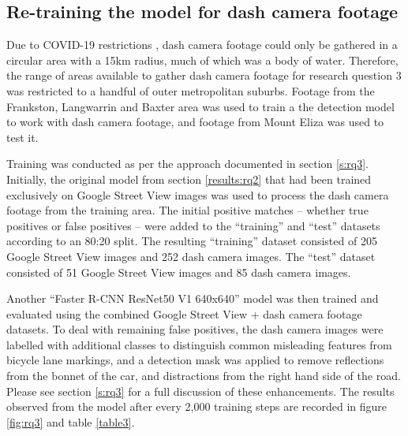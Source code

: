 \documentclass[11pt,twoside]{report}
\begin{document}
\subsection{Re-training the model for dash camera footage}

Due to COVID-19 restrictions \cite{lockdown_record} \cite{lockdown_5km}, dash camera footage could only be gathered in a circular area with a 15km radius, much of which was a body of water.  Therefore, the range of areas available to gather dash camera footage for research question 3 was restricted to a handful of outer metropolitan suburbs.  Footage from the Frankston, Langwarrin and Baxter area was used to train a the detection model to work with dash camera footage, and footage from Mount Eliza was used to test it.

Training was conducted as per the approach documented in section \ref{s:rq3}.  Initially, the original model from section \ref{results:rq2} that had been trained exclusively on Google Street View images was used to process the dash camera footage from the training area.  The initial positive matches -- whether true positives or false positives -- were added to the ``training'' and ``test'' datasets according to an 80:20 split.  The resulting ``training'' dataset consisted of 205 Google Street View images and 252 dash camera images.  The ``test'' dataset consisted of 51 Google Street View images and 85 dash camera images.

Another ``Faster R-CNN ResNet50 V1 640x640'' model was then trained and evaluated using the combined Google Street View + dash camera footage datasets.  To deal with remaining false positives, the dash camera images were labelled with additional classes to distinguish common misleading features from bicycle lane markings, and a detection mask was applied to remove reflections from the bonnet of the car, and distractions from the right hand side of the road.  Please see section \ref{s:rq3} for a full discussion of these enhancements.  The results observed from the model after every 2,000 training steps are recorded in figure \ref{fig:rq3} and table \ref{table3}.
\end{document}
